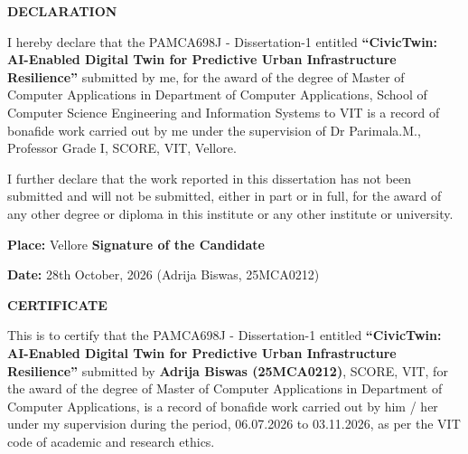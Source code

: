 \documentclass[12pt,a4paper]{report}
\begin{document}


\thispagestyle{empty}
\begin{center}
    {\fontsize{14pt}{18pt}\selectfont \textbf{DECLARATION}\par}
\end{center}
\vspace{1.5cm}

\noindent I hereby declare that the PAMCA698J - Dissertation-1 entitled \textbf{``CivicTwin: AI-Enabled Digital Twin for Predictive Urban Infrastructure Resilience''} submitted by me, for the award of the degree of Master of Computer Applications in Department of Computer Applications, School of Computer Science Engineering and Information Systems to VIT is a record of bonafide work carried out by me under the supervision of Dr Parimala.M., Professor Grade I, SCORE, VIT, Vellore.

\vspace{0.8cm}
\noindent I further declare that the work reported in this dissertation has not been submitted and will not be submitted, either in part or in full, for the award of any other degree or diploma in this institute or any other institute or university.

\vspace{3.5cm}
\noindent \textbf{Place:} Vellore \hfill \textbf{Signature of the Candidate}

\vspace{0.3cm}
\noindent \textbf{Date:} 28th October, 2026 \hfill (Adrija Biswas, 25MCA0212)

\clearpage


\thispagestyle{empty}
\begin{center}
    {\fontsize{14pt}{18pt}\selectfont \textbf{CERTIFICATE}\par}
\end{center}
\vspace{1.5cm}

\noindent This is to certify that the PAMCA698J - Dissertation-1 entitled \textbf{``CivicTwin: AI-Enabled Digital Twin for Predictive Urban Infrastructure Resilience''} submitted by \textbf{Adrija Biswas (25MCA0212)}, SCORE, VIT, for the award of the degree of Master of Computer Applications in Department of Computer Applications, is a record of bonafide work carried out by him / her under my supervision during the period, 06.07.2026 to 03.11.2026, as per the VIT code of academic and research ethics.
\end{document}

